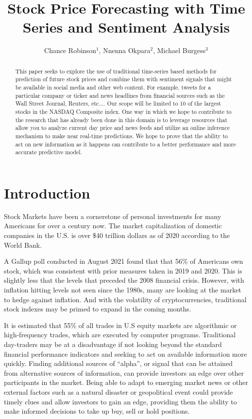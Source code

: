 \documentclass{llncs}
\title{Stock Price Forecasting with Time Series and Sentiment Analysis}
\author{Chance Robinson$^1$, Nnenna Okpara$^2$, Michael Burgess$^3$}
\institute{$^1$Master of Science in Data Science \\ Southern Methodist University \\ Dallas, Texas USA \\
\{\email{chance},
\email{nokpara},
\email{mwburgess}\}@smu.edu}
\begin{document}
\maketitle

\begin{abstract}
This paper seeks to explore the use of traditional time-series based methods for prediction of future stock prices and combine them with sentiment signals that might be available in social media and other web content. For example, tweets for a particular company or ticker and news headlines from financial sources such as the Wall Street Journal, Reuters, etc.... Our scope will be limited to 10 of the largest stocks in the NASDAQ Composite index. One way in which we hope to contribute to the research that has already been done in this domain is to leverage resources that allow you to analyze current day price and news feeds and utilize an online inference mechanism to make near real-time predictions. We hope to prove that the ability to act on new information as it happens can contribute to a better performance and more accurate predictive model.
\end{abstract}


\section{Introduction}

Stock Markets have been a cornerstone of personal investments for many Americans for over a century now. The market capitalization of domestic companies in the U.S. is over \$40 trillion dollars as of 2020 according to the World Bank.

A Gallup poll conducted in August 2021 found that that 56\% of Americans own stock, which was consistent with prior measures taken in 2019 and 2020. This is slightly less that the levels that preceded the 2008 financial crisis. However, with inflation hitting levels not seen since the 1980s, many are looking at the market to hedge against inflation. And with the volatility of cryptocurrencies, traditional stock indexes may be primed to expand in the coming months.

It is estimated that 55\% of all trades in U.S equity markets are algorithmic or high-frequency trades, which are executed by computer programs. Traditional day-traders may be at a disadvantage if not looking beyond the standard financial performance indicators and seeking to act on available information more quickly. Finding additional sources of “alpha”, or signal that can be attained from alternative sources of information, can provide investors an edge over other participants in the market. Being able to adapt to emerging market news or other external factors such as a natural disaster or geopolitical event could provide timely clues and allow investors to gain an edge, providing them the ability to make informed decisions to take up buy, sell or hold positions.
\end{document}
